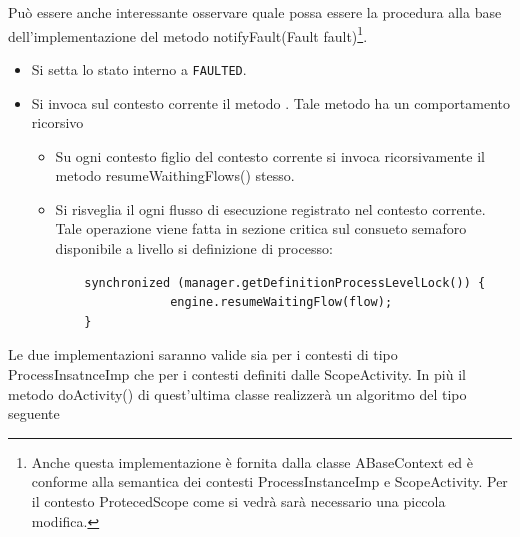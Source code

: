 Può essere anche interessante osservare quale possa essere la procedura alla
base dell'implementazione del metodo notifyFault(Fault fault)\footnote{Anche
questa implementazione \`e fornita dalla classe ABaseContext ed \`e conforme
alla semantica dei contesti ProcessInstanceImp e ScopeActivity. Per il contesto
ProtecedScope come si vedrà sarà necessario una piccola modifica.}.

\begin{itemize}
  \item Si setta lo stato interno a \texttt{FAULTED}.
  \item Si invoca sul contesto corrente il metodo .
  Tale metodo ha un comportamento ricorsivo
  \begin{itemize}
  	\item  Su ogni contesto figlio del contesto corrente si invoca ricorsivamente
  	il metodo resumeWaithingFlows() stesso.
  	\item Si risveglia il ogni flusso di esecuzione registrato nel contesto
  	corrente. Tale operazione viene fatta in sezione critica sul consueto
  	semaforo disponibile a livello si definizione di processo:
	\lstset{frame=NONE}  	
	\begin{lstlisting}
	synchronized (manager.getDefinitionProcessLevelLock()) {
                engine.resumeWaitingFlow(flow);
    }
  	\end{lstlisting}	  	 
  \end{itemize}
\end{itemize}

Le due implementazioni saranno valide sia per i contesti di tipo
ProcessInsatnceImp che per i contesti definiti dalle ScopeActivity. In più il
metodo doActivity() di quest'ultima classe realizzerà un algoritmo del tipo seguente

